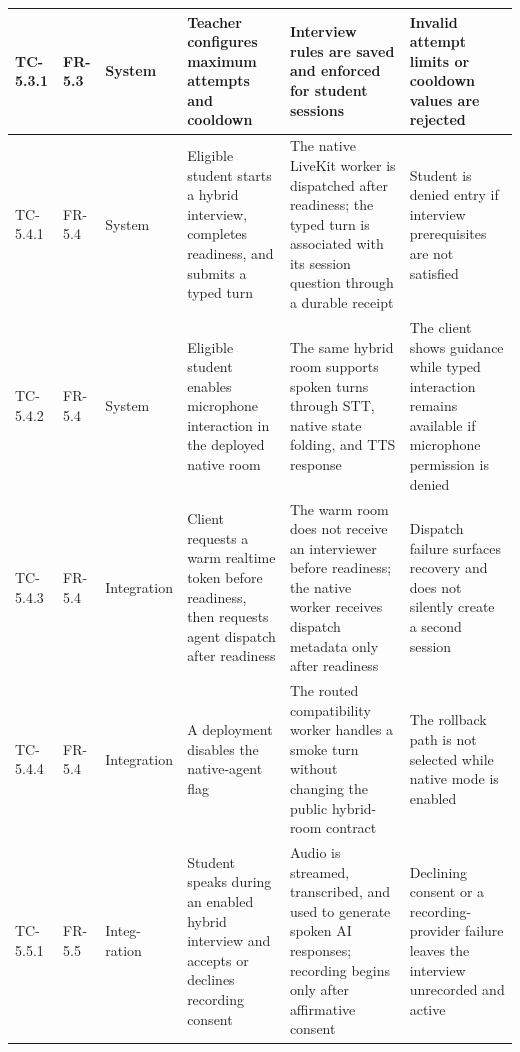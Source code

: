 \begin{longtable}{|>{\centering\arraybackslash}m{}|>{\centering\arraybackslash}m{}|>{\centering\arraybackslash}m{}|m{}|m{}|m{}|}
TC-5.3.1 & FR-5.3 & System & Teacher configures maximum attempts and cooldown & Interview rules are saved and enforced for student sessions & Invalid attempt limits or cooldown values are rejected \\ \hline

TC-5.4.1 & FR-5.4 & System & Eligible student starts a hybrid interview, completes readiness, and submits a typed turn & The native LiveKit worker is dispatched after readiness; the typed turn is associated with its session question through a durable receipt & Student is denied entry if interview prerequisites are not satisfied \\ \hline
TC-5.4.2 & FR-5.4 & System & Eligible student enables microphone interaction in the deployed native room & The same hybrid room supports spoken turns through STT, native state folding, and TTS response & The client shows guidance while typed interaction remains available if microphone permission is denied \\ \hline
TC-5.4.3 & FR-5.4 & Integration & Client requests a warm realtime token before readiness, then requests agent dispatch after readiness & The warm room does not receive an interviewer before readiness; the native worker receives dispatch metadata only after readiness & Dispatch failure surfaces recovery and does not silently create a second session \\ \hline
TC-5.4.4 & FR-5.4 & Integration & A deployment disables the native-agent flag & The routed compatibility worker handles a smoke turn without changing the public hybrid-room contract & The rollback path is not selected while native mode is enabled \\ \hline

TC-5.5.1 & FR-5.5 & Integ-ration & Student speaks during an enabled hybrid interview and accepts or declines recording consent & Audio is streamed, transcribed, and used to generate spoken AI responses; recording begins only after affirmative consent & Declining consent or a recording-provider failure leaves the interview unrecorded and active \\ \hline


\end{longtable}
